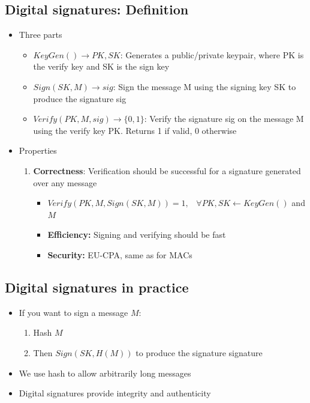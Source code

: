 \documentclass[12pt,a4paper]{article}
\begin{document}
\subsection{Digital signatures: Definition}
\begin{itemize}
    \item Three parts
    \begin{itemize}
        \item $KeyGen() \rightarrow PK, SK$: Generates a public/private keypair, where PK is the verify key and SK is the sign key
        \item $Sign(SK,M) \rightarrow sig$: Sign the message M using the signing key SK to produce the signature sig
        \item $Verify(PK, M, sig) \rightarrow \{0,1\}$: Verify the signature sig on the message M using the verify key PK. Returns 1 if valid, 0 otherwise
    \end{itemize}
    \item Properties
    \begin{enumerate}
        \item \textbf{Correctness}: Verification should be successful for a signature generated over any message
        \begin{itemize}
            \item $Verify(PK, M, Sign(SK, M)) = 1, \hspace{10pt} \forall PK, SK \leftarrow KeyGen()$ and $M$
            \item \textbf{Efficiency: }Signing and verifying should be fast
            \item \textbf{Security: }EU-CPA, same as for MACs
        \end{itemize}
    \end{enumerate}
\end{itemize}

\subsection{Digital signatures in practice}
\begin{itemize}
    \item If you want to sign a message $M$:
    \begin{enumerate}
        \item Hash $M$
        \item Then $Sign(SK, H(M))$ to produce the signature signature
    \end{enumerate}
    \item We use hash to allow arbitrarily long messages
    \item Digital signatures provide integrity and authenticity
\end{itemize}
\end{document}
